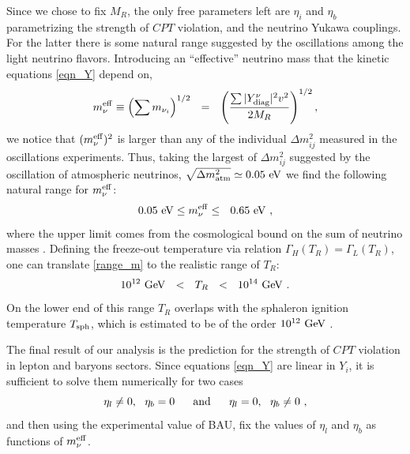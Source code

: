 \documentclass[12pt]{revtex4}
\newcommand{\Tsph}{T_{\rm sph}}
\newcommand{\meff}{m^{\rm eff}_\nu}
\newcommand{\GeV}{{\rm GeV}}
\newcommand{\eV}{{\rm eV}}
\begin{document}
Since we chose to fix $M_R$, the only free parameters left are 
$\eta_i$ and $\eta_b$ parametrizing the strength of $CPT$ violation, 
and the neutrino Yukawa couplings. 
For the latter there is some natural range suggested by the 
oscillations among the light neutrino flavors. 
Introducing an ``effective'' neutrino mass that the kinetic equations 
\eqref{eqn_Y} depend on,
\begin{equation}
	\meff \equiv \left( \sum m_{\nu_i} \right)^{1/2}~~=~~ \left(\frac{\sum |Y^\nu_{\rm diag}|^2v^2}{2M_R}\right)^{1/2},
\end{equation}
we notice that $(\meff)^2$ is larger than any of the individual $\Delta m^2_{ij}$ measured 
in the oscillations experiments. Thus, taking the largest of $\Delta m^2_{ij}$ suggested by 
the oscillation of atmospheric neutrinos, 
$ \sqrt{\Delta m_{\rm atm}^2} \simeq 0.05~\eV $
\cite{Yao:2006px}
we find the following natural range for $\meff$:
\begin{equation}
\label{range_m}
	0.05~\eV\leq \meff\leq~~ 0.65~\eV~,
\end{equation}
where the upper limit comes from the cosmological
	bound on the sum of neutrino masses 
\cite{Hannestad:2003ye}.
	Defining the freeze-out temperature via relation
	$\Gamma_H(T_R)=\Gamma_L(T_R)$, one can translate 
	\eqref{range_m} to the realistic range of $T_R$:
		\begin{equation}
	10^{12}~\GeV ~~<~~ T_R ~~<~~ 10^{14}~\GeV~.
\end{equation}
		On the lower end of this range $ T_R $ overlaps with the 
	sphaleron ignition temperature $ \Tsph $, which is estimated
	to be of the order $ 10^{12}~\GeV $ \cite{Buchmuller:2005eh}.  



The final result of our analysis is the prediction for the 
strength of $CPT$ violation in lepton and baryons sectors. 
Since equations \eqref{eqn_Y} are linear in $ Y_i $,
	it is sufficient to solve them numerically for two cases
\[
	\eta_l \neq 0,~~\eta_b = 0~~~~~ {\rm and}~~~~~ \eta_l = 0,~~\eta_b \neq 0~,
\]
	and then using the experimental value of BAU, fix the values of $ \eta_l $ and $ \eta_b $ 
	as  functions of $\meff$. 
	
\end{document}
